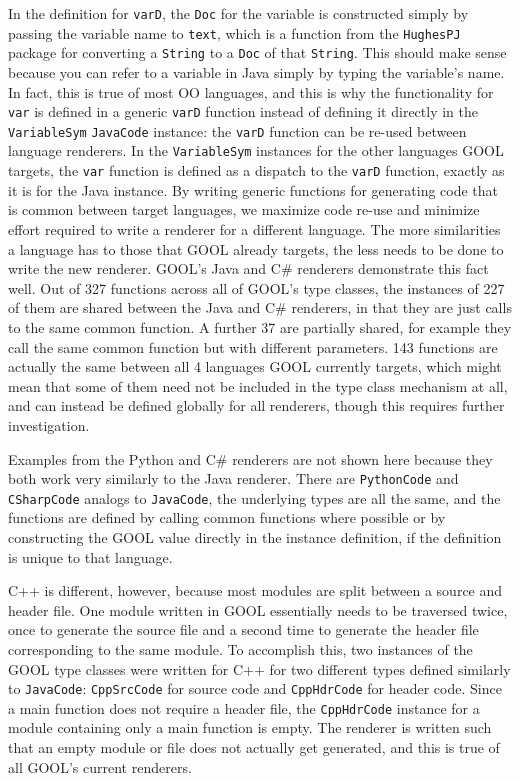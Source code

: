 \documentclass[sigplan,review,anonymous,prologue,dvipsnames]{acmart}
\begin{document}
In the definition for \verb|varD|, the \verb|Doc| for the variable is 
constructed simply by passing the variable name to \verb|text|, which is a 
function from the \verb|HughesPJ| package for converting a \verb|String| to a 
\verb|Doc| of that \verb|String|. This should make sense because you can refer 
to a variable in Java simply by typing the variable's name. In fact, this is 
true of most OO languages, and this is why the functionality for \verb|var| is 
defined in a generic \verb|varD| function instead of defining it directly in 
the \verb|VariableSym| \verb|JavaCode| instance: the \verb|varD| function can 
be re-used between language renderers. In the \verb|VariableSym| instances for 
the other languages GOOL targets, the \verb|var| function is defined as a 
dispatch to the \verb|varD| function, exactly as it is for the Java instance. 
By writing generic functions for generating code that is common between target 
languages, we maximize code re-use and minimize effort required to write a 
renderer for a different language. The more similarities a language has to 
those that GOOL already targets, the less needs to be done to write the new 
renderer. GOOL's Java and C\# renderers demonstrate this fact well. Out of 327 
functions across all of GOOL's type classes, the instances of 227 of them are 
shared between the Java and C\# renderers, in that they are just calls to the 
same common function. A further 37 are partially shared, for example they call 
the same common function but with different parameters. 143 functions are 
actually the same between all 4 languages GOOL currently targets, which might 
mean that some of them need not be included in the type class mechanism at all, 
and can instead be defined globally for all renderers, though this requires 
further investigation.

Examples from the Python and C\# renderers are not shown here because they both 
work very similarly to the Java renderer. There are \verb|PythonCode| and 
\verb|CSharpCode| analogs to \verb|JavaCode|, the underlying types are all the 
same, and the functions are defined by calling common functions where possible 
or by constructing the GOOL value directly in the instance definition, if the 
definition is unique to that language.

C++ is different, however, because most modules are split between a source and 
header file. One module written in GOOL essentially needs to be traversed 
twice, once to generate the source file and a second time to generate the 
header file corresponding to the same module. To accomplish this, two instances 
of the GOOL type classes were written for C++ for two different types defined 
similarly to \verb|JavaCode|: \verb|CppSrcCode| for source code and 
\verb|CppHdrCode| for header code. Since a main function does not require a 
header file, the \verb|CppHdrCode| instance for a module containing only a main 
function is empty. The renderer is written such that an empty module or file 
does not actually get generated, and this is true of all GOOL's current 
renderers. 
\end{document}
